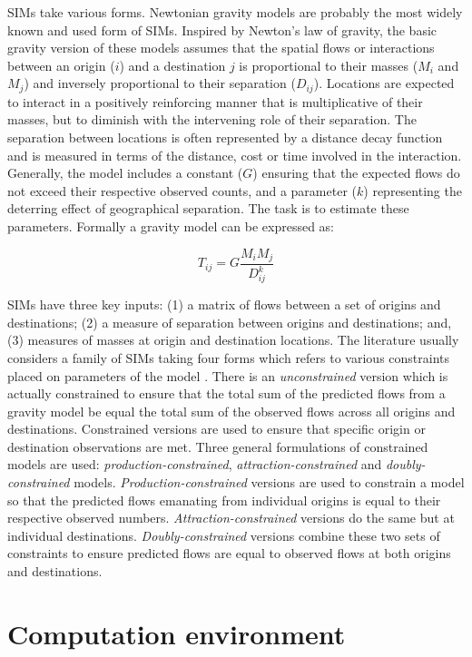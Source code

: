 \documentclass[
  a4paper, 
  twoside,
  final
]{article}
\begin{document}
SIMs take various forms. Newtonian gravity models are probably the most
widely known and used form of SIMs. Inspired by Newton's law of gravity,
the basic gravity version of these models assumes that the spatial flows
or interactions between an origin (\(i\)) and a destination \(j\) is
proportional to their masses (\(M_{i}\) and \(M_{j}\)) and inversely
proportional to their separation (\(D_{ij}\)). Locations are expected to
interact in a positively reinforcing manner that is multiplicative of
their masses, but to diminish with the intervening role of their
separation. The separation between locations is often represented by a
distance decay function and is measured in terms of the distance, cost
or time involved in the interaction. Generally, the model includes a
constant (\(G\)) ensuring that the expected flows do not exceed their
respective observed counts, and a parameter (\(k\)) representing the
deterring effect of geographical separation. The task is to estimate
these parameters. Formally a gravity model can be expressed as:

\[
T_{ij} = G \frac{M_{i} M_{j}}{D^{k}_{ij} }
\]

SIMs have three key inputs: (1) a matrix of flows between a set of
origins and destinations; (2) a measure of separation between origins
and destinations; and, (3) measures of masses at origin and destination
locations. The literature usually considers a family of SIMs taking four
forms which refers to various constraints placed on parameters of the
model \citep{wilson1971}. There is an \emph{unconstrained} version which
is actually constrained to ensure that the total sum of the predicted
flows from a gravity model be equal the total sum of the observed flows
across all origins and destinations. Constrained versions are used to
ensure that specific origin or destination observations are met. Three
general formulations of constrained models are used:
\emph{production-constrained}, \emph{attraction-constrained} and
\emph{doubly-constrained} models. \emph{Production-constrained} versions
are used to constrain a model so that the predicted flows emanating from
individual origins is equal to their respective observed numbers.
\emph{Attraction-constrained} versions do the same but at individual
destinations. \emph{Doubly-constrained} versions combine these two sets
of constraints to ensure predicted flows are equal to observed flows at
both origins and destinations.

\section{Computation environment}\label{sec-comenv}
\end{document}
